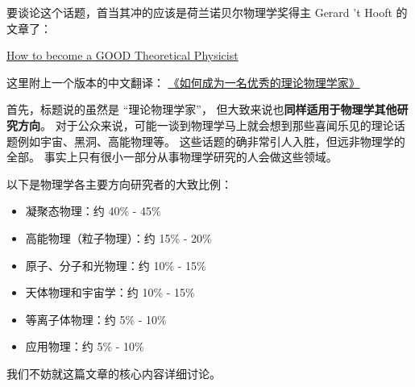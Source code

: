 
要谈论这个话题，首当其冲的应该是荷兰诺贝尔物理学奖得主 Gerard 't Hooft 的文章了：

\href{https://webspace.science.uu.nl/~hooft101/theorist.html}{How to become a GOOD Theoretical Physicist}

这里附上一个版本的中文翻译： \href{https://xialab.pku.edu.cn/kytdyw1/zdylm.m.jsp?wbtreeid=1011&tstreeid=11956&_t_uid=2945&language=en&homepageuuid=BF649325C5584FC683CE0B601D21AC65&templateuuid=4CC182410BA14FF8B55ED726FB2087FB&producttype=0&_tmode_=99&tsitesapptype=zdylm}{《如何成为一名优秀的理论物理学家》}

首先，标题说的虽然是 “理论物理学家”， 但大致来说也\textbf{同样适用于物理学其他研究方向}。 对于公众来说，可能一谈到物理学马上就会想到那些喜闻乐见的理论话题例如宇宙、黑洞、高能物理等。 这些话题的确非常引人入胜，但远非物理学的全部。 事实上只有很小一部分从事物理学研究的人会做这些领域。 

以下是物理学各主要方向研究者的大致比例：
\begin{itemize}
\item 凝聚态物理：约 40\% - 45\%
\item 高能物理（粒子物理）：约 15\% - 20\%
\item 原子、分子和光物理：约 10\% - 15\%
\item 天体物理和宇宙学：约 10\% - 15\%
\item 等离子体物理：约 5\% - 10\%
\item 应用物理：约 5\% - 10\%
\end{itemize}


我们不妨就这篇文章的核心内容详细讨论。
